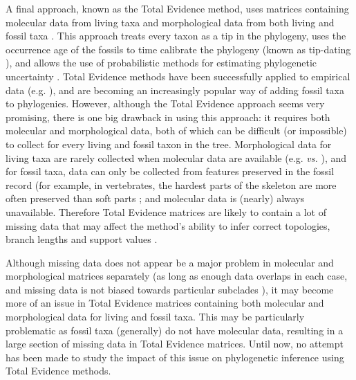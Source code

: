 \documentclass[10pt,letterpaper]{article}
\begin{document}
A final approach, known as the Total Evidence method, uses matrices containing molecular data from living taxa and morphological data from both living and fossil taxa \cite{eernissetaxonomic1993}. This approach treats every taxon as a tip in the phylogeny, uses the occurrence age of the fossils to time calibrate the phylogeny (known as tip-dating \cite{ronquista2012}), and allows the use of probabilistic methods for estimating phylogenetic uncertainty \cite{ronquista2012}. Total Evidence methods have been successfully applied to empirical data (e.g. \cite{pyrondivergence2011,ronquista2012,schragocombining2013,slaterphylogenetic2013,beckancient2014}), and are becoming an increasingly popular way of adding fossil taxa to phylogenies.
However, although the Total Evidence approach seems very promising, there is one big drawback in using this approach: it requires both molecular and morphological data, both of which can be difficult (or impossible) to collect for every living and fossil taxon in the tree.
Morphological data for living taxa are rarely collected when molecular data are available (e.g. \cite{O'Leary08022013} \textit{vs.} \cite{meredithimpacts2011}), and for fossil taxa, data can only be collected from features preserved in the fossil record (for example, in vertebrates, the hardest parts of the skeleton are more often preserved than soft parts \cite{sansomfossilization2013}; and molecular data is (nearly) always unavailable. Therefore Total Evidence matrices are likely to contain a lot of missing data that may affect the method's ability to infer correct topologies, branch lengths and support values \cite{salamin2003}. 

Although missing data does not appear be a major problem in molecular and morphological matrices separately (as long as enough data overlaps in each case, and missing data is not biased towards particular subclades \cite{wiensmissing2003,wiensmissing2006,wiensmissing2008,lemmonthe2009,Sanderson22072011,rouresite-specific2011,pattinsonphylogeny2014}), it may become more of an issue in Total Evidence matrices containing both molecular and morphological data for living and fossil taxa. This may be particularly problematic as fossil taxa (generally) do not have molecular data, resulting in a large section of missing data in Total Evidence matrices. Until now, no attempt has been made to study the impact of this issue on phylogenetic inference using Total Evidence methods.
\end{document}
